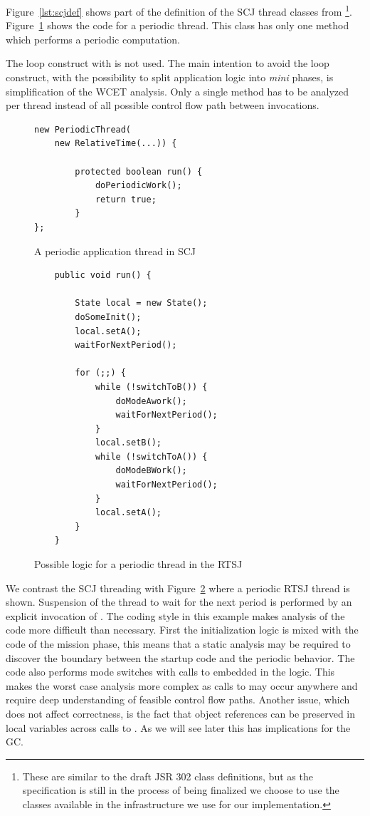 Figure~\ref{lst:scjdef} shows part of the definition of the SCJ thread
classes from \cite{jop:scjava}\footnote{These are similar to the draft JSR
  302 class definitions, but as the specification is still in the process of
  being finalized we choose to use the classes available in the
  infrastructure we use for our implementation.}. Figure~\ref{lst:per} shows
the code for a periodic thread. This class has only one  method
which performs a periodic computation.

The loop construct with  is not used. The main
intention to avoid the loop construct, with the possibility to split
application logic into \emph{mini} phases, is simplification of the
WCET analysis. Only a single method has to be analyzed per thread
instead of all possible control flow path between 
invocations.

\begin{figure}[!t]
{\small
\begin{verbatim}
new PeriodicThread(
    new RelativeTime(...)) {

        protected boolean run() {
            doPeriodicWork();
            return true;
        }
};
\end{verbatim} }
    \caption{A periodic application thread in SCJ}
    \label{lst:per}
\end{figure}

\begin{figure}[!t]
{\small
\begin{verbatim}
    public void run() {

        State local = new State();
        doSomeInit();
        local.setA();
        waitForNextPeriod();

        for (;;) {
            while (!switchToB()) {
                doModeAwork();
                waitForNextPeriod();
            }
            local.setB();
            while (!switchToA()) {
                doModeBWork();
                waitForNextPeriod();
            }
            local.setA();
        }
    }
\end{verbatim} }
    \caption{Possible logic for a periodic thread in the RTSJ}\label{lst:rtsj:per}
\end{figure}


We contrast the SCJ threading with Figure~\ref{lst:rtsj:per} where a
periodic RTSJ thread is shown. Suspension of the thread to wait for
the next period is performed by an explicit invocation of
. The coding style in this example makes analysis of
the code more difficult than necessary. First the initialization
logic is mixed with the code of the mission phase, this means that a
static analysis may be required to discover the boundary between the
startup code and the periodic behavior. The code also performs mode
switches with calls to  embedded in the logic. This
makes the worst case analysis more complex as calls to 
may occur anywhere and require deep understanding of feasible control
flow paths.  Another issue, which does not affect correctness, is
the fact that object references can be preserved in local variables
across calls to . As we will see later this has
implications for the GC.


